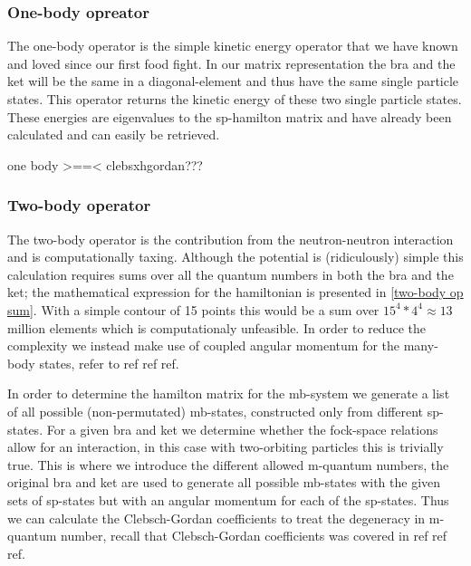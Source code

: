 \subsubsection{One-body opreator}
The one-body operator is the simple kinetic energy operator that we have known and loved since our first food fight. 
 In our matrix representation the bra and the ket will be the same in a diagonal-element and thus have the same single particle states.
 This operator returns the kinetic energy of these two single particle states. 
 These energies are eigenvalues to the sp-hamilton matrix and have already been calculated and can easily be retrieved.

one body >==< clebsxhgordan???

\subsubsection{Two-body operator}
The two-body operator is the contribution from the neutron-neutron interaction and is computationally taxing. Although the potential is (ridiculously) simple this calculation requires sums over all the quantum numbers in both the bra and the ket; the mathematical expression for the hamiltonian is presented in \ref{two-body op sum}. 
With a simple contour of 15 points this would be a sum over $15^4*4^4 \approx 13$ million elements which is computationaly unfeasible.
In order to reduce the complexity we instead make use of coupled angular momentum for the many-body states, refer to ref ref ref.



In order to determine the hamilton matrix for the mb-system we generate a list of all possible (non-permutated) mb-states, constructed only from different sp-states.
For a given bra and ket we determine whether the fock-space relations allow for an interaction, in this case with two-orbiting particles this is trivially true.
This is where we introduce the different allowed m-quantum numbers, the original bra and ket are used to generate all possible mb-states with the given sets of sp-states but with an angular momentum for each of the sp-states.
Thus we can calculate the Clebsch-Gordan coefficients to treat the degeneracy in m-quantum number, recall that Clebsch-Gordan coefficients was covered in ref ref ref.

